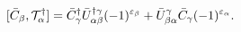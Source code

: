 \begin{equation}\label{5.19}
[\bar{C}_\beta,{\cal T}^\dagger_\alpha]=
\bar{C}^\dagger_\gamma\bar{U}^{\dagger\gamma}_{\alpha\beta}
(-1)^{\varepsilon_\beta}+
\bar{U}^\gamma_{\beta\alpha}\bar{C}_\gamma(-1)^{\varepsilon_\alpha}.
\end{equation}

